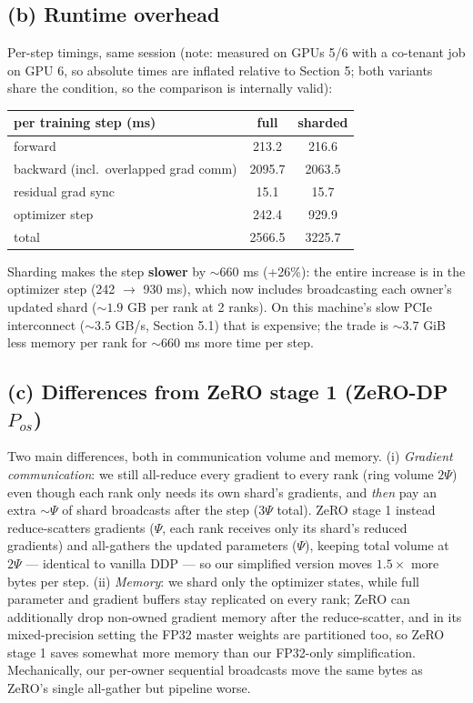 \documentclass[11pt]{article}
\begin{document}
\subsection{(b) Runtime overhead}

Per-step timings, same session (note: measured on GPUs 5/6 with a co-tenant job on GPU 6, so
absolute times are inflated relative to Section 5; both variants share the condition, so the
comparison is internally valid):

\begin{center}\small
\begin{tabular}{lcc}
\toprule
per training step (ms) & full & sharded \\
\midrule
forward                       & 213.2  & 216.6 \\
backward (incl.\ overlapped grad comm) & 2095.7 & 2063.5 \\
residual grad sync            & 15.1   & 15.7 \\
optimizer step                & 242.4  & 929.9 \\
\midrule
total                         & 2566.5 & 3225.7 \\
\bottomrule
\end{tabular}
\end{center}

Sharding makes the step \textbf{slower} by ${\sim}660$ ms (+26\%): the entire increase is in the
optimizer step (242 $\rightarrow$ 930 ms), which now includes broadcasting each owner's updated
shard (${\sim}1.9$ GB per rank at 2 ranks). On this machine's slow PCIe interconnect
(${\sim}3.5$ GB/s, Section 5.1) that is expensive; the trade is ${\sim}3.7$ GiB less memory per
rank for ${\sim}660$ ms more time per step.

\subsection{(c) Differences from ZeRO stage 1 (ZeRO-DP $P_{os}$)}

Two main differences, both in communication volume and memory. (i) \emph{Gradient communication}:
we still all-reduce every gradient to every rank (ring volume $2\Psi$) even though each rank only
needs its own shard's gradients, and \emph{then} pay an extra ${\sim}\Psi$ of shard broadcasts
after the step ($3\Psi$ total). ZeRO stage 1 instead reduce-scatters gradients ($\Psi$, each rank
receives only its shard's reduced gradients) and all-gathers the updated parameters ($\Psi$),
keeping total volume at $2\Psi$ --- identical to vanilla DDP --- so our simplified version moves
$1.5\times$ more bytes per step. (ii) \emph{Memory}: we shard only the optimizer states, while full
parameter and gradient buffers stay replicated on every rank; ZeRO can additionally drop non-owned
gradient memory after the reduce-scatter, and in its mixed-precision setting the FP32 master
weights are partitioned too, so ZeRO stage 1 saves somewhat more memory than our FP32-only
simplification. Mechanically, our per-owner sequential broadcasts move the same bytes as ZeRO's
single all-gather but pipeline worse.
\end{document}
